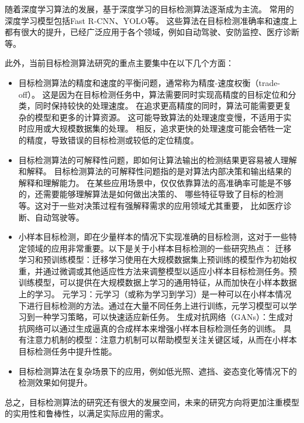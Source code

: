 随着深度学习算法的发展，基于深度学习的目标检测算法逐渐成为主流。
常用的深度学习模型包括Fast R-CNN\cite{girshick2015fast}、YOLO\cite{jiang2022review}等。
这些算法在目标检测准确率和速度上都有很大的提升，已经广泛应用于各个领域，例如自动驾驶、安防监控、医疗诊断等。
\par
此外，当前目标检测算法研究的重点主要集中在以下几个方面：
\begin{itemize}[itemindent=2em]
    \item 目标检测算法的精度和速度的平衡问题，通常称为精度-速度权衡（trade-off）。
    这是因为在目标检测任务中，算法需要同时实现高精度的目标定位和分类，同时保持较快的处理速度。
    在追求更高精度的同时，算法可能需要更复杂的模型和更多的计算资源。
    这可能导致算法的处理速度变慢，不适用于实时应用或大规模数据集的处理。
    相反，追求更快的处理速度可能会牺牲一定的精度，导致错误的目标检测或较低的定位精度。
    
    \item 目标检测算法的可解释性问题，即如何让算法输出的检测结果更容易被人理解和解释。
    目标检测算法的可解释性问题指的是对算法内部决策和输出结果的解释和理解能力。
    在某些应用场景中，仅仅依靠算法的高准确率可能是不够的，还需要能够理解算法是如何做出决策的、
    哪些特征导致了目标的检测等。这对于一些对决策过程有强解释需求的应用领域尤其重要，
    比如医疗诊断、自动驾驶等。
    
    \item 小样本目标检测，即在少量样本的情况下实现准确的目标检测，这对于一些特定领域的应用非常重要。以下是关于小样本目标检测的一些研究热点：
    迁移学习和预训练模型：迁移学习使用在大规模数据集上预训练的模型作为初始权重，并通过微调或其他适应性方法来调整模型以适应小样本目标检测任务。预训练模型，可以提供在大规模数据上学习的通用特征，从而加快在小样本数据上的学习。
    元学习：元学习（或称为学习到学习）是一种可以在小样本情况下进行目标检测的方法。通过在大量不同任务上进行训练，元学习模型可以学习到一种学习策略，可以快速适应新任务。
    生成对抗网络（GANs）：生成对抗网络可以通过生成逼真的合成样本来增强小样本目标检测任务的训练。
    具有注意力机制的模型：注意力机制可以帮助模型关注关键区域，从而在小样本目标检测任务中提升性能。
    
    \item 目标检测算法在复杂场景下的应用，例如低光照、遮挡、姿态变化等情况下的检测效果如何提升。
    
\end{itemize}


总之，目标检测算法的研究还有很大的发展空间，未来的研究方向将更加注重模型的实用性和鲁棒性，以满足实际应用的需求。

